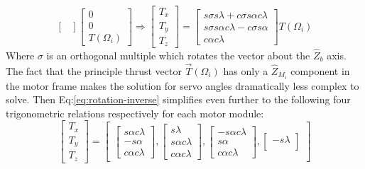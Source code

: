 {\begin{subequations}
\begin{equation}
\begin{bmatrix}
\end{bmatrix}
\begin{bmatrix}
0\\
0\\
T(\Omega_i)
\end{bmatrix}
\end{equation}
\begin{equation}\label{eq:rotation-inverse}
\Rightarrow
\begin{bmatrix}
T_x\\
T_y\\
T_z
\end{bmatrix}
=\begin{bmatrix}
s\sigma s\lambda + c\sigma s\alpha c\lambda\\
s\sigma s\alpha c\lambda - c\sigma s\alpha\\
c\alpha c\lambda
\end{bmatrix}
T(\Omega_i)
\end{equation}
\end{subequations}
Where $\sigma$ is an orthogonal multiple which rotates the vector about the $\hat{Z}_b$ axis. The fact that the principle thrust vector $\vec{T}(\Omega_i)$ has only a $\hat{Z}_{M_i}$ component in the motor frame makes the solution for servo angles dramatically less complex to solve. Then Eq:\ref{eq:rotation-inverse} simplifies even further to the following four trigonometric relations respectively for each motor module:
\begin{equation}
\begin{bmatrix}
T_x\\
T_y\\
T_z
\end{bmatrix}
=
\begin{bmatrix}
\begin{bmatrix}
s\alpha c\lambda\\
-s\alpha \\
c\alpha c\lambda
\end{bmatrix}
,
\begin{bmatrix}
s\lambda\\
s\alpha c\lambda\\
c\alpha c\lambda
\end{bmatrix}
,
\begin{bmatrix}
-s\alpha c\lambda\\
s\alpha\\
c\alpha c\lambda
\end{bmatrix}
,
\begin{bmatrix}
-s\lambda\\

\end{bmatrix}
\end{bmatrix}
\end{equation}}
